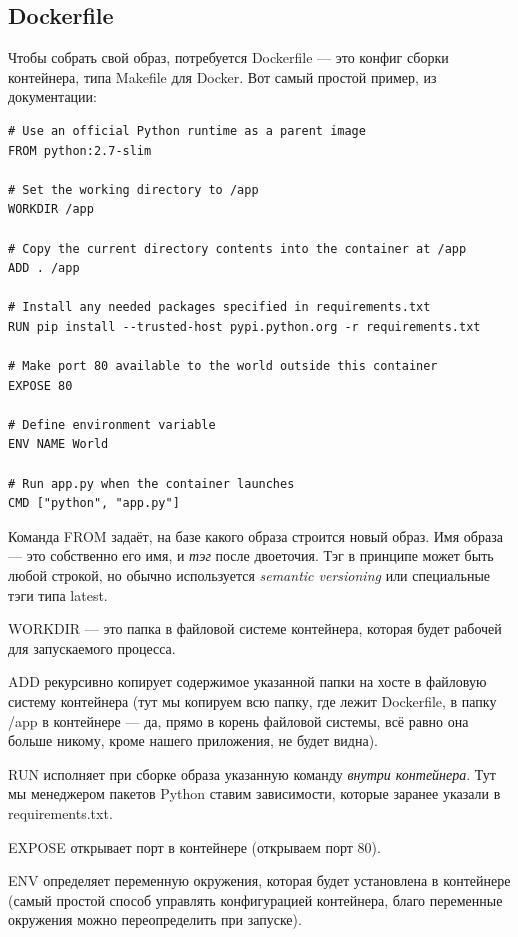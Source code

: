 \documentclass{../../text-style}
\begin{document}
\subsection{Dockerfile}

Чтобы собрать свой образ, потребуется Dockerfile --- это конфиг сборки контейнера, типа Makefile для Docker. Вот самый простой пример, из документации:

\begin{verbatim}
# Use an official Python runtime as a parent image
FROM python:2.7-slim

# Set the working directory to /app
WORKDIR /app

# Copy the current directory contents into the container at /app
ADD . /app

# Install any needed packages specified in requirements.txt
RUN pip install --trusted-host pypi.python.org -r requirements.txt

# Make port 80 available to the world outside this container
EXPOSE 80

# Define environment variable
ENV NAME World

# Run app.py when the container launches
CMD ["python", "app.py"]
\end{verbatim}

Команда FROM задаёт, на базе какого образа строится новый образ. Имя образа --- это собственно его имя, и \emph{тэг} после двоеточия. Тэг в принципе может быть любой строкой, но обычно используется \emph{semantic versioning} или специальные тэги типа latest.

WORKDIR --- это папка в файловой системе контейнера, которая будет рабочей для запускаемого процесса. 

ADD рекурсивно копирует содержимое указанной папки на хосте в файловую систему контейнера (тут мы копируем всю папку, где лежит Dockerfile, в папку /app в контейнере --- да, прямо в корень файловой системы, всё равно она больше никому, кроме нашего приложения, не будет видна).

RUN исполняет при сборке образа указанную команду \emph{внутри контейнера}. Тут мы менеджером пакетов Python ставим зависимости, которые заранее указали в requirements.txt.

EXPOSE открывает порт в контейнере (открываем порт 80).

ENV определяет переменную окружения, которая будет установлена в контейнере (самый простой способ управлять конфигурацией контейнера, благо переменные окружения можно переопределить при запуске).
\end{document}
